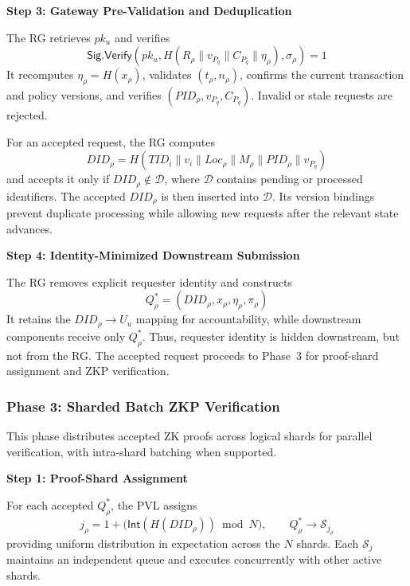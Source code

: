 \documentclass[lettersize,journal]{IEEEtran}
\begin{document}
\smallskip
\noindent\textbf{Step 3: Gateway Pre-Validation and Deduplication}

The RG retrieves $pk_u$ and verifies
\begin{equation}
\mathsf{Sig.Verify}
\left(
pk_u,H(R_\rho\parallel v_{P_q}\parallel C_{P_q}\parallel\eta_\rho),
\sigma_\rho
\right)=1
\label{eq:signature-verification}
\end{equation}
It recomputes $\eta_\rho=H(x_\rho)$, validates $(t_\rho,n_\rho)$,
confirms the current transaction and policy versions, and verifies
$(PID_\rho,v_{P_q},C_{P_q})$. Invalid or stale requests are rejected.

For an accepted request, the RG computes
\begin{equation}
DID_\rho=
H(TID_i\parallel v_i\parallel Loc_\rho\parallel M_\rho
\parallel PID_\rho\parallel v_{P_q})
\label{eq:deduplication-id}
\end{equation}
and accepts it only if $DID_\rho\notin\mathcal{D}$, where $\mathcal{D}$
contains pending or processed identifiers. The accepted $DID_\rho$ is
then inserted into $\mathcal{D}$. Its version bindings prevent duplicate
processing while allowing new requests after the relevant state advances.

\smallskip
\noindent\textbf{Step 4: Identity-Minimized Downstream Submission}

The RG removes explicit requester identity and constructs
\begin{equation}
Q_\rho^{*}=(DID_\rho,x_\rho,\eta_\rho,\pi_\rho)
\label{eq:identity-minimized-query}
\end{equation}
It retains the $DID_\rho\!\rightarrow\!U_u$ mapping for accountability,
while downstream components receive only $Q_\rho^{*}$. Thus, requester
identity is hidden downstream, but not from the RG. The accepted request
proceeds to Phase~3 for proof-shard assignment and ZKP verification.
\medskip


\subsubsection*{\textbf{Phase 3: Sharded Batch ZKP Verification}}
\label{sec:phase3}

This phase distributes accepted ZK proofs across logical shards for parallel verification, with intra-shard batching when supported.

\smallskip
\noindent\textbf{Step 1: Proof-Shard Assignment}

For each accepted $Q_\rho^{*}$, the PVL assigns
\begin{equation}
j_\rho=
1+\big(\mathsf{Int}(H(DID_\rho))\bmod N\big),
\qquad
Q_\rho^{*}\rightarrow\mathcal{S}_{j_\rho}
\label{eq:phase3-shard}
\end{equation}
providing uniform distribution in expectation across the $N$ shards. Each $\mathcal{S}_j$ maintains an independent queue and executes concurrently with other active shards.
\end{document}
